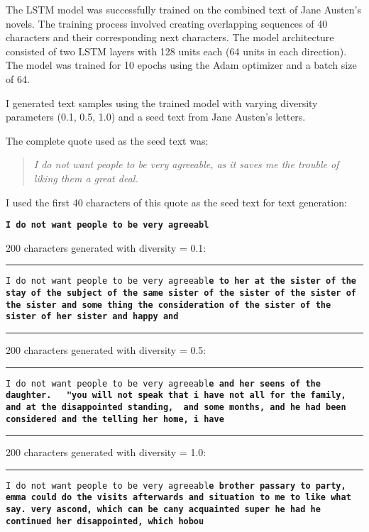 \documentclass{article}
\begin{document}
The LSTM model was successfully trained on the combined text of Jane Austen's novels. The training process involved creating overlapping sequences of 40 characters and their corresponding next characters. The model architecture consisted of two LSTM layers with 128 units each (64 units in each direction). The model was trained for 10 epochs using the Adam optimizer and a batch size of 64.

I generated text samples using the trained model with varying diversity parameters (0.1, 0.5, 1.0) and a seed text from Jane Austen's letters.

The complete quote used as the seed text was:

\begin{quote}
    \textit{I do not want people to be very agreeable, as it saves me the trouble of liking them a great deal.}
\end{quote}

I used the first 40 characters of this quote as the seed text for text generation:

\noindent \texttt{\textbf{I do not want people to be very agreeabl}}

200 characters generated with diversity = 0.1:

\noindent \rule{\textwidth}{0.4pt}
\texttt{I do not want people to be very agreeabl\textbf{e to her at the sister of the stay of the subject of the same sister of the sister of the sister of the sister and some thing the consideration of the sister of the sister of her sister and happy and}}

\noindent \rule{\textwidth}{0.4pt}

200 characters generated with diversity = 0.5:

\noindent \rule{\textwidth}{0.4pt}
\texttt{I do not want people to be very agreeabl\textbf{e and her seens of the daughter. \
\
"you will not speak that i have not all for the family, and at the disappointed standing, \
and some months, and he had been considered and the telling her home, i have}}

\noindent \rule{\textwidth}{0.4pt}

200 characters generated with diversity = 1.0:

\noindent \rule{\textwidth}{0.4pt}
\texttt{I do not want people to be very agreeabl\textbf{e brother
passary to party, emma could do the visits afterwards
and situation to me to like what say.  very ascond, which can be cany acquainted super he had he continued her disappointed, which hobou}}
\end{document}
